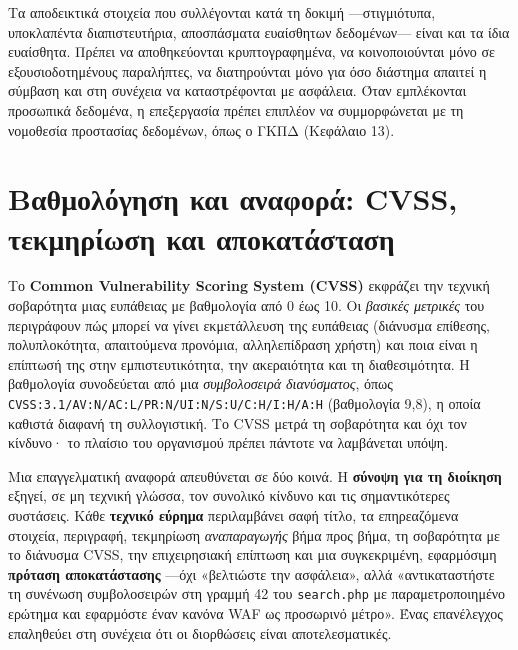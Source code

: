Τα αποδεικτικά στοιχεία που συλλέγονται κατά τη δοκιμή —στιγμιότυπα, υποκλαπέντα διαπιστευτήρια, αποσπάσματα ευαίσθητων δεδομένων— είναι και τα ίδια ευαίσθητα. Πρέπει να αποθηκεύονται κρυπτογραφημένα, να κοινοποιούνται μόνο σε εξουσιοδοτημένους παραλήπτες, να διατηρούνται μόνο για όσο διάστημα απαιτεί η σύμβαση και στη συνέχεια να καταστρέφονται με ασφάλεια. Όταν εμπλέκονται προσωπικά δεδομένα, η επεξεργασία πρέπει επιπλέον να συμμορφώνεται με τη νομοθεσία προστασίας δεδομένων, όπως ο ΓΚΠΔ (Κεφάλαιο 13).

\section{Βαθμολόγηση και αναφορά: CVSS, τεκμηρίωση και αποκατάσταση}\label{sec:10.6}
Το \textbf{Common Vulnerability Scoring System (CVSS)} εκφράζει την τεχνική σοβαρότητα μιας ευπάθειας με βαθμολογία από 0 έως 10. Οι \emph{βασικές μετρικές} του περιγράφουν πώς μπορεί να γίνει εκμετάλλευση της ευπάθειας (διάνυσμα επίθεσης, πολυπλοκότητα, απαιτούμενα προνόμια, αλληλεπίδραση χρήστη) και ποια είναι η επίπτωσή της στην εμπιστευτικότητα, την ακεραιότητα και τη διαθεσιμότητα. Η βαθμολογία συνοδεύεται από μια \emph{συμβολοσειρά διανύσματος}, όπως \texttt{CVSS:3.1/AV:N/AC:L/PR:N/UI:N/S:U/C:H/I:H/A:H} (βαθμολογία 9,8), η οποία καθιστά διαφανή τη συλλογιστική. Το CVSS μετρά τη σοβαρότητα και όχι τον κίνδυνο· το πλαίσιο του οργανισμού πρέπει πάντοτε να λαμβάνεται υπόψη.

Μια επαγγελματική αναφορά απευθύνεται σε δύο κοινά. Η \textbf{σύνοψη για τη διοίκηση} εξηγεί, σε μη τεχνική γλώσσα, τον συνολικό κίνδυνο και τις σημαντικότερες συστάσεις. Κάθε \textbf{τεχνικό εύρημα} περιλαμβάνει σαφή τίτλο, τα επηρεαζόμενα στοιχεία, περιγραφή, τεκμηρίωση \emph{αναπαραγωγής} βήμα προς βήμα, τη σοβαρότητα με το διάνυσμα CVSS, την επιχειρησιακή επίπτωση και μια συγκεκριμένη, εφαρμόσιμη \textbf{πρόταση αποκατάστασης} —όχι «βελτιώστε την ασφάλεια», αλλά «αντικαταστήστε τη συνένωση συμβολοσειρών στη γραμμή 42 του \texttt{search.php} με παραμετροποιημένο ερώτημα και εφαρμόστε έναν κανόνα WAF ως προσωρινό μέτρο». Ένας επανέλεγχος επαληθεύει στη συνέχεια ότι οι διορθώσεις είναι αποτελεσματικές.

